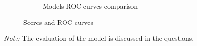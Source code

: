 \begin{figure}[H]
\begin{subfigure}{0.45\textwidth}
    \caption{Models ROC curves comparison}
    \label{fig:immagine2}
  \end{subfigure}
  \caption{Scores and ROC curves}
  \label{fig:immagini}
\end{figure}

\textit{Note:} The evaluation of the model is discussed in the questions.